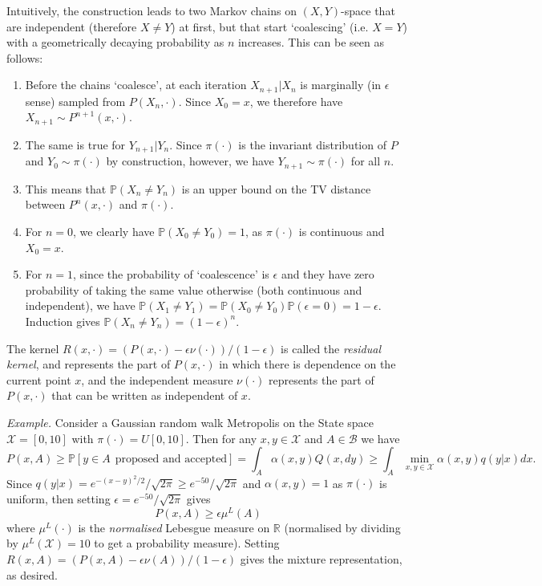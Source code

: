 \documentclass{article}
\newcommand{\X}{\mathcal{X}}
\newcommand{\B}{\mathcal{B}}
\begin{document}
Intuitively, the construction leads to two Markov chains on $(X,Y)$-space that are independent (therefore $X\neq Y$) at first, but that start `coalescing' (i.e. $X=Y$) with a geometrically decaying probability as $n$ increases. This can be seen as follows:
\begin{enumerate}
\item Before the chains `coalesce', at each iteration $X_{n+1}|X_n$ is marginally (in $\epsilon$ sense) sampled from $P(X_n,\cdot)$. Since $X_0=x$, we therefore have $X_{n+1} \sim P^{n+1}(x,\cdot)$.
\item The same is true for $Y_{n+1}|Y_n$. Since $\pi(\cdot)$ is the invariant distribution  of $P$ and $Y_0\sim\pi(\cdot)$ by construction, however, we have $Y_{n+1} \sim \pi(\cdot)$ for all $n$.
\item This means that $\mathbb{P}(X_n \neq Y_n)$ is an upper bound on the TV distance between $P^{n}(x,\cdot)$ and $\pi(\cdot)$.
\item For $n=0$, we clearly have $\mathbb{P}(X_0 \neq Y_0)=1$, as $\pi(\cdot)$ is continuous and $X_0 = x$.
\item For $n=1$, since the probability of `coalescence' is $\epsilon$ and they have zero probability of taking the same value otherwise (both continuous and independent), we have $\mathbb{P}(X_1 \neq Y_1)=\mathbb{P}(X_0 \neq Y_0)\mathbb{P}(\epsilon=0)=1-\epsilon$.  Induction gives $\mathbb{P}(X_n \neq Y_n) = (1-\epsilon)^n$. 
\end{enumerate}

The kernel $R(x,\cdot) = (P(x,\cdot) - \epsilon\nu(\cdot))/(1-\epsilon)$ is called the \emph{residual kernel}, and represents the part of $P(x,\cdot)$ in which there is dependence on the current point $x$, and the independent measure $\nu(\cdot)$ represents the part of $P(x,\cdot)$ that can be written as independent of $x$.

\vspace{0.3cm}

\textit{Example.}  Consider a Gaussian random walk Metropolis on the State space $\X = [0,10]$ with $\pi(\cdot) = U[0,10]$.  Then for any $x,y \in \X$ and $A \in \B$ we have
\[
P(x,A) \geq \mathbb{P}[y \in A ~~ \text{proposed and accepted}] = \int_A \alpha(x,y)Q(x,dy) \geq \int_A \min_{x,y \in \X}{\alpha(x,y)q(y|x)} dx.
\]
Since $q(y|x) = e^{-(x-y)^2/2}/\sqrt{2\pi} \geq e^{-50}/\sqrt{2\pi}$ and $\alpha(x,y) = 1$ as $\pi(\cdot)$ is uniform, then setting $\epsilon = e^{-50}/\sqrt{2\pi}$ gives
\[
P(x,A) \geq \epsilon \mu^L(A)
\]
where $\mu^L(\cdot)$ is the \emph{normalised} Lebesgue measure on $\mathbb{R}$ (normalised by dividing by $\mu^L(\X) = 10$ to get a probability measure).  Setting $R(x,A) = (P(x,A) - \epsilon \nu(A))/(1-\epsilon)$ gives the mixture representation, as desired.
\end{document}
